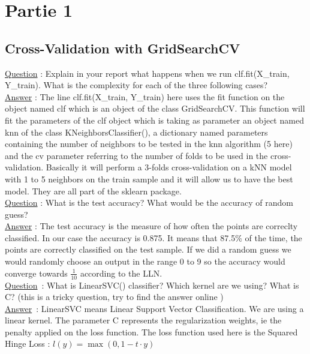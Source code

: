 \section{Partie 1}

\subsection{Cross-Validation with GridSearchCV}
\underline{Question} : Explain in your report what happens when we run clf.fit(X\_train, Y\_train). What is the complexity for each of the three following cases?  \\ 

\underline{Answer} :  The line clf.fit(X\_train, Y\_train) here uses the fit function on the object named clf which is an object of the class GridSearchCV. This function will fit the parameters of the clf object which is taking as parameter an object named knn of the class KNeighborsClassifier(), a dictionary named parameters containing the number of neighbors to be tested in the knn algorithm (5 here) and the cv parameter referring to the number of folds to be used in the cross-validation. Basically it will perform a 3-folds cross-validation on a kNN model with 1 to 5 neighbors on the train sample and it will allow us to have the best model. They are all part of the sklearn package. \\

\underline{Question} : What is the test accuracy? What would be the accuracy of random guess? \\

\underline{Answer} : The test accuracy is the measure of how often the points are correclty classified. In our case the accuracy is 0.875.  It means that 87.5\% of the time, the points are correctly classified on the test sample. If we did a random guess we would randomly choose an output in the range 0 to 9 so the accuracy would converge towards $\frac{1}{10}$ according to the LLN.  \\


\underline{Question} :  What is LinearSVC() classifier? Which kernel are we using? What is C? (this is a tricky question, try to find the answer online )\\

\underline{Answer} : LinearSVC means Linear Support Vector Classification. We are using a linear kernel. The parameter C represents the regularization weights, ie the penalty applied on the loss function. The loss function used here is the Squared Hinge Loss : $l(y)=\max(0,1-t\cdot y)$ \\

